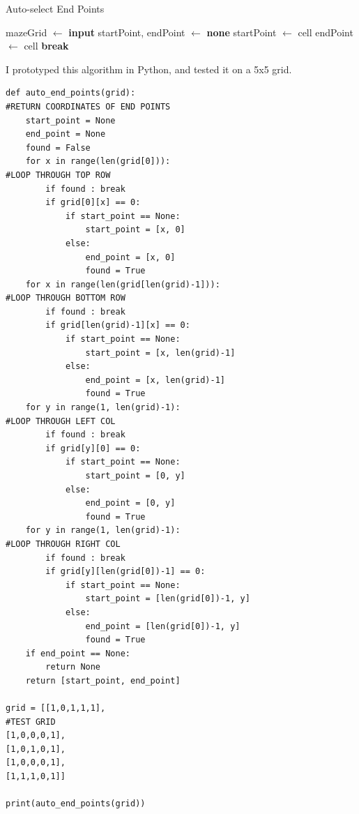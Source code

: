 \documentclass[titlepage]{article}
\begin{document}
\begin{algorithm}[H]
\caption{Auto-select End Points}
\begin{algorithmic}[1]
    	\State mazeGrid $\gets$ \textbf{input}
    	\State startPoint, endPoint $\gets$ \textbf{none}
				\State startPoint $\gets$ cell
			\Else
				\State endPoint $\gets$ cell
				\State \textbf{break}
			\EndIf
		\EndIf
	\EndFor
\end{algorithmic}
\end{algorithm}

I prototyped this algorithm in Python, and tested it on a 5x5 grid.

\begin{changemargin}{-1in}{-1in} 
\begin{verbatim}
def auto_end_points(grid):                                                      #RETURN COORDINATES OF END POINTS
    start_point = None
    end_point = None
    found = False
    for x in range(len(grid[0])):                                               #LOOP THROUGH TOP ROW
        if found : break
        if grid[0][x] == 0:
            if start_point == None:
                start_point = [x, 0]
            else:
                end_point = [x, 0]
                found = True
    for x in range(len(grid[len(grid)-1])):                                     #LOOP THROUGH BOTTOM ROW
        if found : break
        if grid[len(grid)-1][x] == 0:
            if start_point == None:
                start_point = [x, len(grid)-1]
            else:
                end_point = [x, len(grid)-1]
                found = True
    for y in range(1, len(grid)-1):                                             #LOOP THROUGH LEFT COL
        if found : break
        if grid[y][0] == 0:
            if start_point == None:
                start_point = [0, y]
            else:
                end_point = [0, y]
                found = True
    for y in range(1, len(grid)-1):                                             #LOOP THROUGH RIGHT COL
        if found : break
        if grid[y][len(grid[0])-1] == 0:
            if start_point == None:
                start_point = [len(grid[0])-1, y]
            else:
                end_point = [len(grid[0])-1, y]
                found = True
    if end_point == None:
        return None
    return [start_point, end_point]

grid = [[1,0,1,1,1],                                                               #TEST GRID
[1,0,0,0,1],
[1,0,1,0,1],
[1,0,0,0,1],
[1,1,1,0,1]]

print(auto_end_points(grid))                       
\end{verbatim}
\end{changemargin} 
\end{document}
